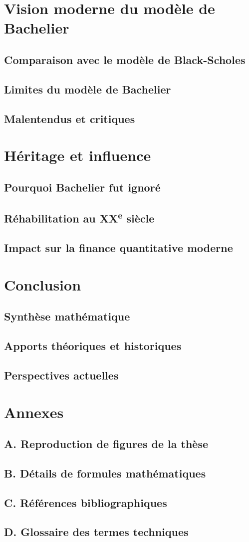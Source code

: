 \documentclass[12pt,a4paper]{article}
\begin{document}
\section{Vision moderne du modèle de Bachelier}
\subsection{Comparaison avec le modèle de Black-Scholes}
\subsection{Limites du modèle de Bachelier}
\subsection{Malentendus et critiques}

\section{Héritage et influence}
\subsection{Pourquoi Bachelier fut ignoré}
\subsection{Réhabilitation au XX\textsuperscript{e} siècle}
\subsection{Impact sur la finance quantitative moderne}

\section{Conclusion}
\subsection{Synthèse mathématique}
\subsection{Apports théoriques et historiques}
\subsection{Perspectives actuelles}

\appendix
\section*{Annexes}
\subsection*{A. Reproduction de figures de la thèse}
\subsection*{B. Détails de formules mathématiques}
\subsection*{C. Références bibliographiques}
\subsection*{D. Glossaire des termes techniques}
\end{document}
